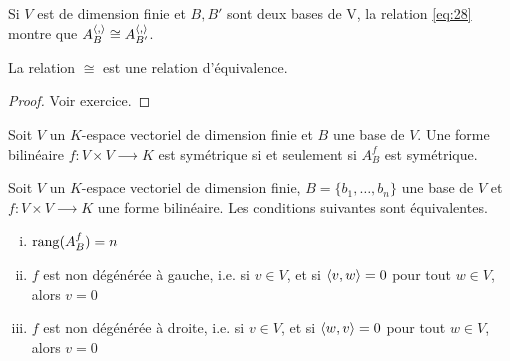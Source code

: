 \begin{example}
  \label{exe:22}
  Si $V$ est de dimension finie et $B,B'$ sont deux bases de V, la relation \eqref{eq:28} montre que $A_B^{\langle {,} \rangle} \cong A_{B'}^{\langle {,} \rangle}$. 
\end{example}

\begin{lemma}
  \label{lem:6}
  La relation $\cong$ est une relation d'équivalence. 
\end{lemma}

\begin{proof}
  Voir exercice. 
\end{proof}




\begin{exercise}
  Soit $V$ un $K$-espace vectoriel de dimension finie et $B$ une base de $V$. 
  Une forme bilinéaire $f : V ×V ⟶ K$ 
  est symétrique si et seulement si $A_B^f$ est symétrique.
\end{exercise}

\begin{proposition}
  \label{prop:7}
  Soit $V$ un $K$-espace vectoriel de dimension finie, $B= \{b_1, \dots , b_n\}$ une base de $V$ et $f : V × V ⟶K$ une forme bilinéaire.   Les conditions suivantes sont équivalentes. 
  \begin{enumerate}[i)]
  \item $\operatorname{rang}(A_B^f) = n$ \label{item:12}
  \item $f$ est non dégénérée à gauche, i.e. si $v \in V$, et si $\langle {v,w} \rangle=0$ pour tout $w \in V$, alors $v = 0$ \label{item:13}
  \item $f$ est non dégénérée à droite, i.e. si $v \in V$, et si $\langle {w, v} \rangle=0$ pour tout $w \in V$, alors $v = 0$ \label{item:14}
  \end{enumerate}
\end{proposition}

